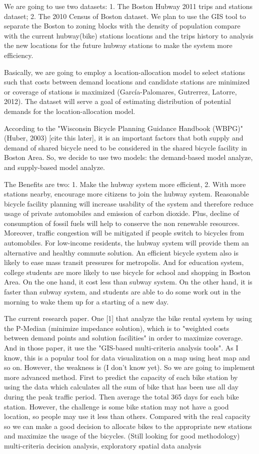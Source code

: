 \documentclass[journal, letterpaper]{IEEEtran}
\begin{document}
We are going to use two datasets: 1. The Boston Hubway 2011 trips and stations dataset; 2. The 2010 Census of Boston dataset. We plan to use the GIS tool to separate the Boston to zoning blocks with the density of population compare with the current hubway(bike) stations locations and the trips history to analysis the new locations for the future hubway stations to make the system more efficiency. 

Basically, we are going to employ a location-allocation model to select stations such that costs between demand locations and candidate stations are minimized or coverage of stations is maximized (García-Palomares, Gutrerrez, Latorre, 2012). The dataset will serve a goal of estimating distribution of potential demands for the location-allocation model. 

According to the "Wisconsin Bicycle Planning Guidance Handbook (WBPG)" (Huber, 2003) [cite this later], it is an important factors that both supply and demand of shared bicycle need to be considered in the shared bicycle facility in Boston Area. So, we decide to use two models: the demand-based model analyze, and supply-based model analyze. 

The Benefits are two: 1. Make the hubway system more efficient, 2. With more stations nearby, encourage more citizens to join the hubway system. Reasonable bicycle facility planning will increase usability of the system and therefore reduce usage of private automobiles and emission of carbon dioxide. Plus, decline of consumption of fossil fuels will help to conserve the non renewable resources. Moreover, traffic congestion will be mitigated if people switch to bicycles from automobiles. For low-income residents, the hubway system will provide them an alternative and healthy commute solution. An efficient bicycle system also is likely to ease mass transit pressures for metropolis. And for education system, college students are more likely to use bicycle for school and shopping in Boston Area. On the one hand, it cost less than subway system. On the other hand, it is faster than subway system, and students are able to do some work out in the morning to wake them up for a starting of a new day. 

The current research paper. One [1] that analyze the bike rental system by using the P-Median (minimize impedance solution), which is to "weighted costs between demand points and solution facilities" in order to maximize coverage. And in those paper, it use the "GIS-based multi-criteria analysis tools". As I know, this is a popular tool for data visualization on a map using heat map and so on. However, the weakness is (I don't know yet). So we are going to implement more advanced method. First to predict the capacity of each bike station by using the data which calculates all the sum of bike that has been use all day during the peak traffic period. Then average the total 365 days for each bike station. However, the challenge is some bike station may not have a good location, so people may use it less than others. Compared with the real capacity so we can make a good decision to allocate bikes to the appropriate new stations and maximize the usage of the bicycles. (Still looking for good methodology) multi-criteria decision analysis, exploratory spatial data analysis 
\end{document}
